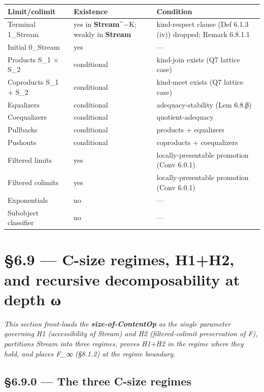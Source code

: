 \documentclass[11pt, openany]{book}
\newcommand{\sectionbreak}{\clearpage}
\begin{document}
\begingroup\setlength{\tabcolsep}{3pt}\renewcommand{\arraystretch}{1.15}\footnotesize
\begin{longtable}{p{0.70in} p{1.54in} p{2.10in}}
\toprule
Limit/colimit & Existence & Condition \\
\midrule
\endhead
\bottomrule
\endfoot
Terminal 1\_\allowbreak{}Stream & yes in \textbf{Stream}\textasciicircum{}{−K}; weakly in \textbf{Stream} & kind-respect clause (Def 6.1.3 (iv)) dropped; Remark 6.8.1.1 \\
\midrule
Initial 0\_\allowbreak{}Stream & yes & --- \\
\midrule
Products S\_\allowbreak{}1 × S\_\allowbreak{}2 & conditional & kind-join exists (Q7 lattice case) \\
\midrule
Coproducts S\_\allowbreak{}1 + S\_\allowbreak{}2 & conditional & kind-meet exists (Q7 lattice case) \\
\midrule
Equalizers & conditional & adequacy-stability (Lem 6.8.β) \\
\midrule
Coequalizers & conditional & quotient-adequacy \\
\midrule
Pullbacks & conditional & products + equalizers \\
\midrule
Pushouts & conditional & coproducts + coequalizers \\
\midrule
Filtered limits & yes & locally-presentable promotion (Conv 6.0.1) \\
\midrule
Filtered colimits & yes & locally-presentable promotion (Conv 6.0.1) \\
\midrule
Exponentials & no & --- \\
\midrule
Subobject classifier & no & --- \\
\bottomrule
\end{longtable}
\endgroup
\sectionbreak

\section{§6.9 --- C-size regimes, H1+H2, and recursive decomposability at depth ω}

\textit{This section front-loads the \textbf{size-of-ContentOp} as the single parameter governing H1 (accessibility of Stream) and H2 (filtered-colimit preservation of F), partitions Stream into three regimes, proves H1+H2 in the regime where they hold, and places F\_\allowbreak{}∞ (§8.1.2) at the regime boundary.}

\subsection{§6.9.0 --- The three C-size regimes}
\end{document}
